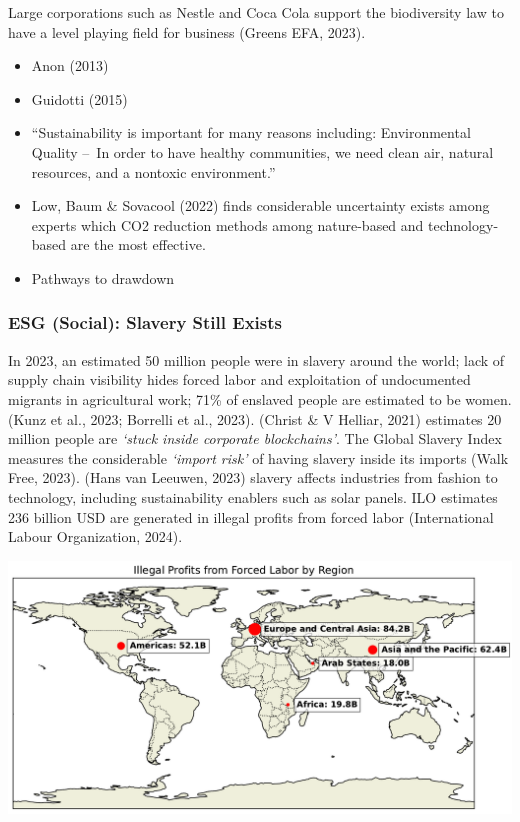\documentclass[
  letterpaper,
  DIV=11,
  numbers=noendperiod]{scrartcl}
\begin{document}
Large corporations such as Nestle and Coca Cola support the biodiversity
law to have a level playing field for business (Greens EFA, 2023).

\begin{itemize}
\item
  Anon (2013)
\item
  Guidotti (2015)
\item
  ``Sustainability is important for many reasons including:
  Environmental Quality --~In order to have healthy communities, we need
  clean air, natural resources, and a nontoxic environment.''
\item
  Low, Baum \& Sovacool (2022) finds considerable uncertainty exists
  among experts which CO2 reduction methods among nature-based and
  technology-based are the most effective.
\item
  Pathways to drawdown
\end{itemize}

\subsubsection{ESG (Social): Slavery Still
Exists}\label{esg-social-slavery-still-exists}

In 2023, an estimated 50 million people were in slavery around the
world; lack of supply chain visibility hides forced labor and
exploitation of undocumented migrants in agricultural work; 71\% of
enslaved people are estimated to be women. (Kunz et al., 2023; Borrelli
et al., 2023). (Christ \& V Helliar, 2021) estimates 20 million people
are \emph{`stuck inside corporate blockchains'}. The Global Slavery
Index measures the considerable \emph{`import risk'} of having slavery
inside its imports (Walk Free, 2023). (Hans van Leeuwen, 2023) slavery
affects industries from fashion to technology, including sustainability
enablers such as solar panels. ILO estimates 236 billion USD are
generated in illegal profits from forced labor (International Labour
Organization, 2024).

\includegraphics{_thesis_files/figure-pdf/cell-62-output-1.pdf}
\end{document}
